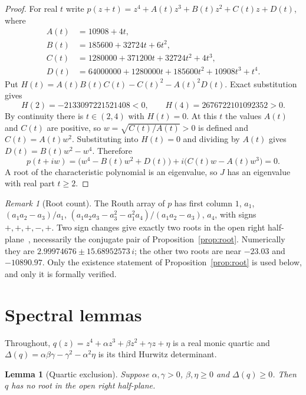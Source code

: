 \documentclass[11pt,a4paper]{article}
\theoremstyle{plain}
\newtheorem{lemma}[theorem]{Lemma}
\theoremstyle{definition}
\theoremstyle{remark}
\newtheorem{remark}[theorem]{Remark}
\begin{document}
\begin{proof}
For real $t$ write $p(z+t)=z^4+A(t)z^3+B(t)z^2+C(t)z+D(t)$, where
\begin{align*}
A(t)&=10908+4t,\\
B(t)&=185600+32724t+6t^2,\\
C(t)&=1280000+371200t+32724t^2+4t^3,\\
D(t)&=64000000+1280000t+185600t^2+10908t^3+t^4 .
\end{align*}
Put $H(t)=A(t)B(t)C(t)-C(t)^2-A(t)^2D(t)$. Exact substitution gives
\begin{equation}\label{eq:endpoints}
H(2)=-2133097221521408<0,\qquad H(4)=2676722101092352>0 .
\end{equation}
By continuity there is $t\in(2,4)$ with $H(t)=0$. At this $t$ the values $A(t)$ and $C(t)$ are positive, so $w=\sqrt{C(t)/A(t)}>0$ is defined and $C(t)=A(t)w^2$. Substituting into $H(t)=0$ and dividing by $A(t)$ gives $D(t)=B(t)w^2-w^4$. Therefore
\[
p(t+iw)=\bigl(w^4-B(t)w^2+D(t)\bigr)+i\bigl(C(t)w-A(t)w^3\bigr)=0 .
\]
A root of the characteristic polynomial is an eigenvalue, so $J$ has an eigenvalue with real part $t\ge2$.
\end{proof}

\begin{remark}[Root count]\label{rem:routh}
The Routh array of $p$ has first column $1$, $a_1$, $(a_1a_2-a_3)/a_1$, $(a_1a_2a_3-a_3^2-a_1^2a_4)/(a_1a_2-a_3)$, $a_4$, with signs $+,+,+,-,+$. Two sign changes give exactly two roots in the open right half-plane~\cite[Ch.~XV]{Gantmacher1959}, necessarily the conjugate pair of Proposition~\ref{prop:root}. Numerically they are $2.99974676\pm15.68952573\,i$; the other two roots are near $-23.03$ and $-10890.97$. Only the existence statement of Proposition~\ref{prop:root} is used below, and only it is formally verified.
\end{remark}

\section{Spectral lemmas}\label{sec:spectral}

Throughout, $q(z)=z^4+\alpha z^3+\beta z^2+\gamma z+\eta$ is a real monic quartic and $\Delta(q)=\alpha\beta\gamma-\gamma^2-\alpha^2\eta$ is its third Hurwitz determinant.

\begin{lemma}[Quartic exclusion]\label{lem:quartic}
Suppose $\alpha,\gamma>0$, $\beta,\eta\ge0$ and $\Delta(q)\ge0$. Then $q$ has no root in the open right half-plane.
\end{lemma}
\end{document}
